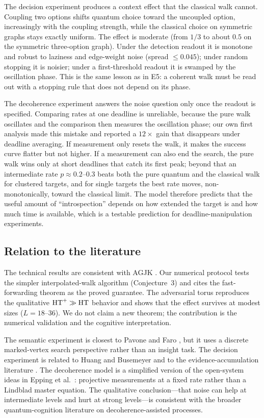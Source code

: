 The decision experiment produces a context effect that the classical walk
cannot. Coupling two options shifts quantum choice toward the uncoupled
option, increasingly with the coupling strength, while the classical choice on
symmetric graphs stays exactly uniform. The effect is moderate (from $1/3$ to
about $0.5$ on the symmetric three-option graph). Under the detection readout
it is monotone and robust to laziness and edge-weight noise (spread
$\le0.045$); under random stopping it is noisier; under a first-threshold
readout it is swamped by the oscillation phase. This is the same lesson as in
E5: a coherent walk must be read out with a stopping rule that does not depend
on its phase.

The decoherence experiment answers the noise question only once the readout
is specified. Comparing rates at one deadline is unreliable, because the pure
walk oscillates and the comparison then measures the oscillation phase; our
own first analysis made this mistake and reported a $12\times$ gain that
disappears under deadline averaging. If measurement only resets the walk, it
makes the success curve flatter but not higher. If a measurement can also end
the search, the pure walk wins only at short deadlines that catch its first
peak; beyond that an intermediate rate $p\approx0.2$--$0.3$ beats both the pure
quantum and the classical walk for clustered targets, and for single targets
the best rate moves, non-monotonically, toward the classical limit. The
model therefore predicts that the useful amount of ``introspection'' depends
on how extended the target is and how much time is available, which is a
testable prediction for deadline-manipulation experiments.

\subsection{Relation to the literature}
\label{sec:discussion-literature}

The technical results are consistent with AGJK \citep{agjk2019}. Our numerical
protocol tests the simpler interpolated-walk algorithm (Conjecture~3) and cites
the fast-forwarding theorem as the proved guarantee. The adversarial torus
reproduces the qualitative $\mathrm{HT}^+\gg\mathrm{HT}$ behavior and shows that the effect
survives at modest sizes ($L=18$--$36$). We do not claim a new theorem; the
contribution is the numerical validation and the cognitive interpretation.

The semantic experiment is closest to Pavone and Faro \citep{pavone2025}, but
it uses a discrete marked-vertex search perspective rather than an insight
task. The decision experiment is related to Huang and Busemeyer
\citep{huang2022} and to the evidence-accumulation literature
\citep{chen2022}. The decoherence model is a simplified version of the
open-system ideas in Epping et al.\ \citep{epping2023}: projective
measurements at a fixed rate rather than a Lindblad master equation. The
qualitative conclusion---that noise can help at intermediate levels and hurt at
strong levels---is consistent with the broader quantum-cognition literature on
decoherence-assisted processes.

